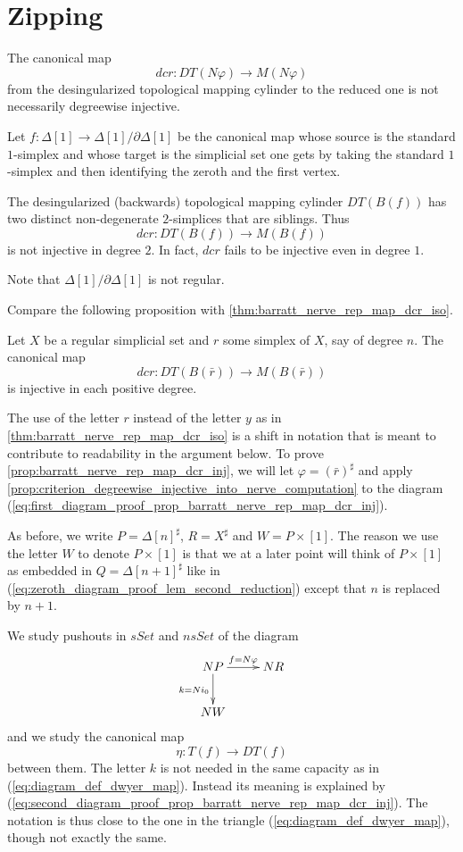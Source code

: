 \section{Zipping}
\label{sec:zipping}

The canonical map
\[dcr:DT(N\varphi )\to M(N\varphi )\]
from the desingularized topological mapping cylinder to the reduced one is not necessarily degreewise injective.
\begin{example}\label{ex:Non-injective_dcylinder_reduction}
Let $f:\Delta [1]\to \Delta [1]/\partial \Delta [1]$ be the canonical map whose source is the standard $1$-simplex and whose target is the simplicial set one gets by taking the standard $1$-simplex and then identifying the zeroth and the first vertex.

The desingularized (backwards) topological mapping cylinder $DT(B(f))$ has two distinct non-degenerate $2$-simplices that are siblings. Thus
\[dcr:DT(B(f))\to M(B(f))\]
is not injective in degree $2$. In fact, $dcr$ fails to be injective even in degree $1$.
\end{example}
\noindent Note that $\Delta [1]/\partial \Delta [1]$ is not regular.

Compare the following proposition with \cref{thm:barratt_nerve_rep_map_dcr_iso}.
\begin{proposition}\label{prop:barratt_nerve_rep_map_dcr_inj}
Let $X$ be a regular simplicial set and $r$ some simplex of $X$, say of degree $n$. The canonical map
\[dcr:DT(B(\bar{r} ))\to M(B(\bar{r} ))\]
is injective in each positive degree.
\end{proposition}
\noindent The use of the letter $r$ instead of the letter $y$ as in \cref{thm:barratt_nerve_rep_map_dcr_iso} is a shift in notation that is meant to contribute to readability in the argument below. To prove \cref{prop:barratt_nerve_rep_map_dcr_inj}, we will let $\varphi =(\bar{r} )^\sharp$ and apply \cref{prop:criterion_degreewise_injective_into_nerve_computation} to the diagram (\ref{eq:first_diagram_proof_prop_barratt_nerve_rep_map_dcr_inj}).

As before, we write $P=\Delta [n]^\sharp$, $R=X^\sharp$ and $W=P\times [1]$. The reason we use the letter $W$ to denote $P\times [1]$ is that we at a later point will think of $P\times [1]$ as embedded in $Q=\Delta [n+1]^\sharp$ like in (\ref{eq:zeroth_diagram_proof_lem_second_reduction}) except that $n$ is replaced by $n+1$.

We study pushouts in $sSet$ and $nsSet$ of the diagram
\begin{equation}
\label{eq:second_diagram_proof_prop_barratt_nerve_rep_map_dcr_inj}
\begin{gathered}
\xymatrix{
NP \ar[d]_{k=Ni_0} \ar[r]^{f=N\varphi} & NR \\
NW
}
\end{gathered}
\end{equation}
and we study the canonical map
\[\eta :T(f)\to DT(f)\]
between them. The letter $k$ is not needed in the same capacity as in (\ref{eq:diagram_def_dwyer_map}). Instead its meaning is explained by (\ref{eq:second_diagram_proof_prop_barratt_nerve_rep_map_dcr_inj}). The notation is thus close to the one in the triangle (\ref{eq:diagram_def_dwyer_map}), though not exactly the same.

